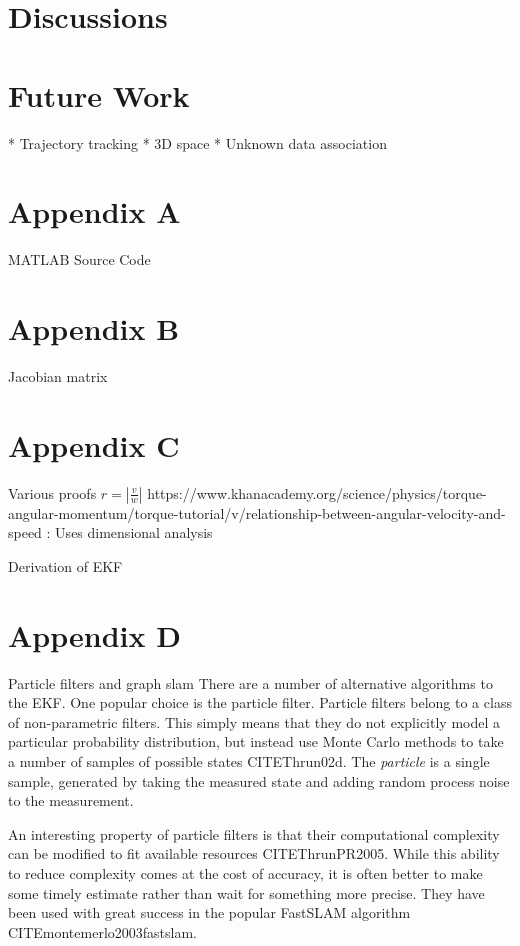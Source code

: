 \documentclass[12pt]{report}
\begin{document}
\chapter{Discussions}

\chapter{Future Work}

* Trajectory tracking
* 3D space
* Unknown data association

\chapter{Appendix A}
MATLAB Source Code

\chapter{Appendix B}
Jacobian matrix

\chapter{Appendix C}
Various proofs
$r = |\frac{v}{w}|$
 https://www.khanacademy.org/science/physics/torque-angular-momentum/torque-tutorial/v/relationship-between-angular-velocity-and-speed 
: Uses dimensional analysis

Derivation of EKF

\chapter{Appendix D}
Particle filters and graph slam
There are a number of alternative algorithms to the EKF.  One popular choice is the particle filter.  Particle filters belong to a class of non-parametric filters.  This simply means that they do not explicitly model a particular probability distribution, but instead use Monte Carlo methods to take a number of samples of possible states CITE{Thrun02d}.   The \emph{particle} is a single sample, generated by taking the measured state and adding random process noise to the measurement.  

An interesting property of particle filters is that their computational complexity can be modified to fit available resources CITE{ThrunPR2005}.  While this ability to reduce complexity comes at the cost of accuracy, it is often better to make some timely estimate rather than wait for something more precise.  They have been used with great success in the popular FastSLAM algorithm CITE{montemerlo2003fastslam}.
\end{document}
